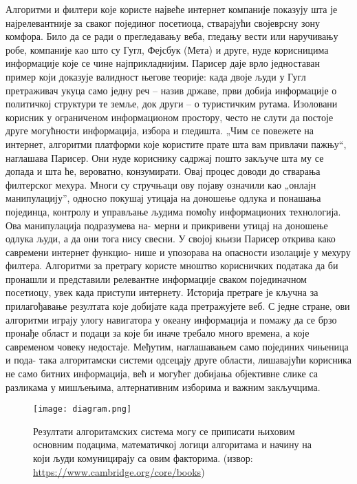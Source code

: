 \documentclass[a4paper]{article}
\begin{document}
Алгоритми и филтери које користе највеће интернет компаније показују шта је најрелевантније за сваког појединог посетиоца, стварајући својеврсну зону комфора. Било да се ради о прегледавању веба, гледању вести или наручивању робе, компаније као што су Гугл, Фејсбук (Мета) и друге, нуде корисницима информације које се чине најприкладнијим. Парисер даје врло једноставан пример који доказује валидност његове теорије: када двоје људи у Гугл претраживач укуца само једну реч – назив државе, први добија информације о политичкој структури те земље, док други – о туристичким рутама. Изоловани корисник у ограниченом информационом простору, често не слути да постоје друге могућности информација, избора и гледишта. „Чим се повежете на интернет, алгоритми платформи које користите прате шта вам привлачи пажњу“, наглашава Парисер. Они нуде кориснику садржај пошто закључе шта му се допада и шта ће, вероватно, конзумирати. Овај процес доводи до стварања филтерског мехура. Многи су стручњаци ову појаву означили као „онлајн манипулацију”, односно покушај утицаја на доношење одлука и понашања појединца, контролу и управљање људима помоћу информационих технологија\cite{susser}. Ова манипулација подразумева на-
мерни и прикривени утицај на доношење одлука људи, а да они тога нису свесни. У својој књизи Парисер открива како савремени интернет функцио-
нише и упозорава на опасности изолације у мехуру филтера. Алгоритми за претрагу користе мноштво корисничких података да би пронашли и представили релевантне информације сваком појединачном посетиоцу, увек када приступи интернету. Историја претраге је кључна за прилагођавање резултата које добијате када претражујете веб. С једне стране, ови алгоритми играју улогу навигатора у океану информација и помажу да се брзо пронађе област и подаци за које би иначе требало много времена, а које савременом човеку недостаје. Међутим, наглашавањем само појединих чињеница и пода-
така алгоритамски системи одсецају друге области, лишавајући корисника не само битних информација, већ и могућег добијања објективне слике са разликама у мишљењима, алтернативним изборима и важним закључцима.

\begin{figure}[hbt!]
\centering
\texttt{[image: diagram.png]}
\caption{Резултати алгоритамских система могу се приписати њиховим основним подацима, математичкој логици алгоритама и начину на који људи комуницирају са овим факторима. (извор: \url{https://www.cambridge.org/core/books})}
\end{figure}
\end{document}
